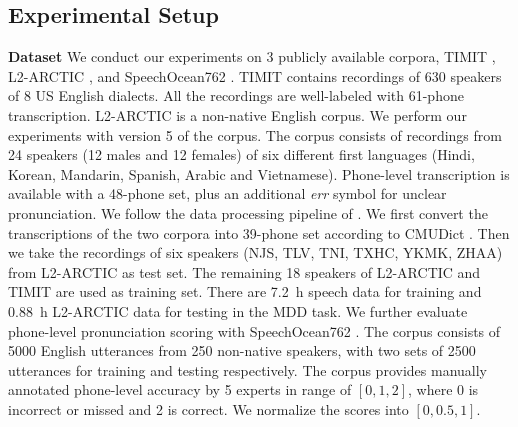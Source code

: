 \documentclass[a4paper]{article}
\begin{document}
\subsection{Experimental Setup}
\noindent \textbf{Dataset} 
We conduct our experiments 
on 3 publicly available corpora, TIMIT \cite{garofolo1993darpa}, L2-ARCTIC  \cite{zhao2018l2}, and SpeechOcean762 \cite{zhang2021speechocean762}.
TIMIT contains recordings of 630 speakers of 8 US English dialects. All the recordings are well-labeled with 61-phone transcription.
L2-ARCTIC is a non-native English corpus. 
We perform our experiments with version 5 of the corpus. 
The corpus consists of recordings from 24 speakers (12 males and 12 females) of six different first languages (Hindi, Korean, Mandarin, Spanish, Arabic and Vietnamese).
Phone-level transcription is available with a 48-phone set, plus an additional \textit{err} symbol for unclear pronunciation. 
We follow the data processing pipeline %
of \cite{fu2021full,peng2021study}. 
We first convert the transcriptions of the two corpora into 39-phone set according to CMUDict \cite{cmudict}. Then we take the recordings of six speakers (NJS, TLV, TNI, TXHC, YKMK, ZHAA) from L2-ARCTIC as test set. The remaining 18 speakers of L2-ARCTIC and TIMIT are used as training set.  There are 7.2~h speech data for training and 0.88~h L2-ARCTIC data for testing in the MDD task.
We further evaluate phone-level pronunciation scoring with SpeechOcean762 \cite{zhang2021speechocean762}. The corpus consists of 5000 English utterances from 250 non-native speakers, with two sets of 2500 utterances for training and testing respectively. The corpus provides manually annotated phone-level accuracy by 5 experts in range of $[0,1,2]$, where 0 is incorrect or missed and 2 is correct. We normalize the scores into $[0,0.5,1]$. 
\end{document}
